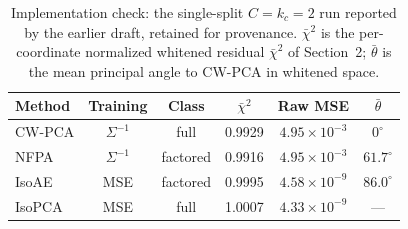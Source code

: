 \begin{table}[t]
  \centering
  \caption{Implementation check: the single-split $C=k_c=2$ run reported by the earlier draft, retained for provenance. $\bar\chi^2$ is the per-coordinate normalized whitened residual $\bar\chi^2$ of Section~2; $\bar\theta$ is the mean principal angle to CW-PCA in whitened space.}
  \label{tab:results}
  \small
  \setlength{\tabcolsep}{3.8pt}
  \begin{tabular}{lccccc}
    \toprule
    Method & Training & Class & $\bar\chi^2$ & Raw MSE & $\bar\theta$ \\
    \midrule
    CW-PCA & $\Sigma^{-1}$ & full & 0.9929 & $4.95\!\times\!10^{-3}$ & $0^\circ$ \\
    NFPA & $\Sigma^{-1}$ & factored & 0.9916 & $4.95\!\times\!10^{-3}$ & $61.7^\circ$ \\
    IsoAE & MSE & factored & 0.9995 & $4.58\!\times\!10^{-9}$ & $86.0^\circ$ \\
    IsoPCA & MSE & full & 1.0007 & $4.33\!\times\!10^{-9}$ & --- \\
    \bottomrule
  \end{tabular}
\end{table}
